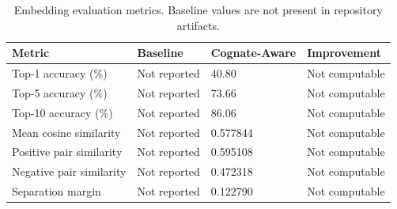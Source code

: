 \begin{table}[ht]
\centering
\caption{Embedding evaluation metrics. Baseline values are not present in repository artifacts.}
\label{tab:embedding\_evaluation}
\begin{tabular}{llll}
\hline
Metric & Baseline & Cognate-Aware & Improvement \\
\hline
Top-1 accuracy (\%) & Not reported & 40.80 & Not computable \\
Top-5 accuracy (\%) & Not reported & 73.66 & Not computable \\
Top-10 accuracy (\%) & Not reported & 86.06 & Not computable \\
Mean cosine similarity & Not reported & 0.577844 & Not computable \\
Positive pair similarity & Not reported & 0.595108 & Not computable \\
Negative pair similarity & Not reported & 0.472318 & Not computable \\
Separation margin & Not reported & 0.122790 & Not computable \\
\hline
\end{tabular}
\end{table}
